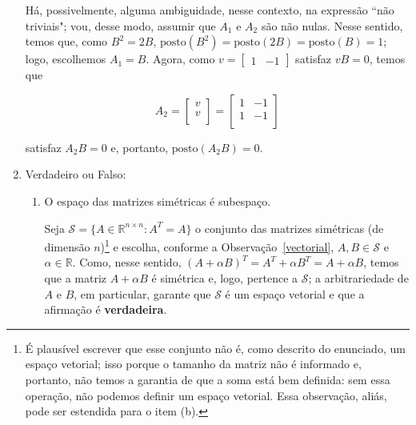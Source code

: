 \documentclass[leqno]{article}
\begin{document}
\begin{enumerate}
    \begin{sol} 
   	Há, possivelmente, alguma ambiguidade, nesse contexto, na expressão  ``não triviais"; vou, desse modo, assumir que $A_{1}$ e $A_{2}$ são não nulas. Nesse sentido, temos que, como $B^{2} = 2B$, $\mathrm{posto}(B^{2}) = \mathrm{posto}(2B) = \mathrm{posto}(B) = 1$; logo, escolhemos $A_{1} = B$. Agora, como $v = \begin{bmatrix} 1 & -1 \end{bmatrix}$ satisfaz $vB = 0$, temos que

	\begin{equation*} 
		A_{2} = 
		\begin{bmatrix} 
			v \\ 
			v \\ 
		\end{bmatrix} = 
		\begin{bmatrix} 
			1 & -1 \\ 
			1 & -1 \\ 
		\end{bmatrix} 
	\end{equation*} 

	\noindent satisfaz $A_{2}B = 0$ e, portanto, $\mathrm{posto}(A_{2}B) = 0$.  
    \end{sol} 

    \item Verdadeiro ou Falso:

        \begin{enumerate}

            \item O espaço das matrizes simétricas é subespaço.
	    
	    \begin{sol} 
		    Seja $\mathcal{S} = \{A \in \mathbb{R}^{n \times n} : A^{T} = A\}$ o conjunto das matrizes simétricas (de dimensão $n$)\footnote{É plausível escrever que esse conjunto não é, como descrito do enunciado, um espaço vetorial; isso porque o tamanho da matriz não é informado e, portanto, não temos a garantia de que a soma está bem definida: sem essa operação, não podemos definir um espaço vetorial. Essa observação, aliás, pode ser estendida para o item (b).} e escolha, conforme a Observação~\ref{vectorial}, $A, B \in \mathcal{S}$ e $\alpha \in \mathbb{R}$. Como, nesse sentido, $(A + \alpha B)^{T} = A^{T} + \alpha B^{T} = A + \alpha B$, temos que a matriz $A + \alpha B$ é simétrica e, logo, pertence a $\mathcal{S}$; a arbitrariedade de $A$ e $B$, em particular, garante que $\mathcal{S}$ é um espaço vetorial e que a afirmação é \textbf{verdadeira}. 
	    \end{sol} 


\end{enumerate}
\end{enumerate}
\end{document}
